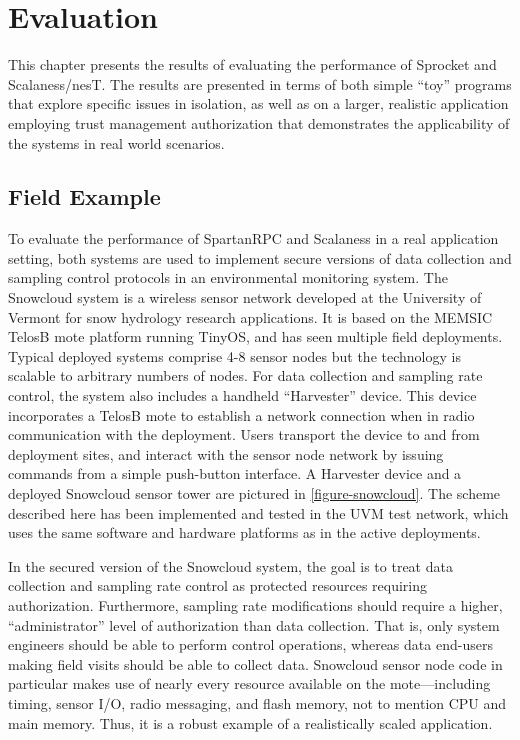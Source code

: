 
\chapter{Evaluation}
\label{chapter-evaluation}

This chapter presents the results of evaluating the performance of Sprocket and Scalaness/nesT.
The results are presented in terms of both simple ``toy'' programs that explore specific issues
in isolation, as well as on a larger, realistic application employing trust management
authorization that demonstrates the applicability of the systems in real world scenarios.

\section{Field Example}
\label{section-field-example}

To evaluate the performance of SpartanRPC and Scalaness in a real application setting, both
systems are used to implement secure versions of data collection and sampling control protocols
in an environmental monitoring system. The Snowcloud system
\cite{frolik-skalka-snowcloudtr,moeser-walker-skalka-frolik-wsc11} is a wireless sensor network
developed at the University of Vermont for snow hydrology research applications. It is based on
the MEMSIC TelosB mote platform running TinyOS, and has seen multiple field deployments. Typical
deployed systems comprise 4-8 sensor nodes but the technology is scalable to arbitrary numbers
of nodes. For data collection and sampling rate control, the system also includes a handheld
``Harvester'' device. This device incorporates a TelosB mote to establish a network connection
when in radio communication with the deployment. Users transport the device to and from
deployment sites, and interact with the sensor node network by issuing commands from a simple
push-button interface. A Harvester device and a deployed Snowcloud sensor tower are pictured in
\autoref{figure-snowcloud}. The scheme described here has been implemented and tested in the UVM
test network, which uses the same software and hardware platforms as in the active deployments.
\snowcloudfig

In the secured version of the Snowcloud system, the goal is to treat data collection and
sampling rate control as protected resources requiring authorization. Furthermore, sampling rate
modifications should require a higher, ``administrator'' level of authorization than data
collection. That is, only system engineers should be able to perform control operations, whereas
data end-users making field visits should be able to collect data. Snowcloud sensor node code in
particular makes use of nearly every resource available on the mote---including timing, sensor
I/O, radio messaging, and flash memory, not to mention CPU and main memory. Thus, it is a robust
example of a realistically scaled application.


